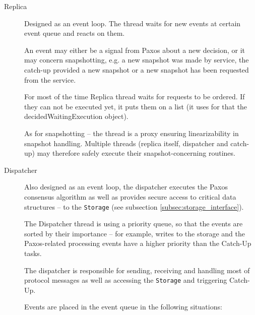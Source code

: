 \begin{description}
  \item[Replica] \hfill
    
    Designed as an event loop. The thread %
    waits for new events at certain event queue and reacts on them.

    An event may either be a signal from Paxos about a new decision, or it may concern snapshotting, e.g. a new snapshot was made by service, the catch-up provided a new snapshot or a new snapshot has been requested from the service.

    For most of the time Replica thread waits for requests to be ordered. If they can not be executed yet, it puts them on a list (it uses for that %
    the decidedWaitingExecution object).
    
    As for snapshotting -- the thread is a proxy ensuring linearizability in snapshot handling.
    Multiple threads (replica itself, dispatcher and catch-up) may therefore safely execute their snapshot-concerning routines.
    
  \item[Dispatcher] \hfill \nopagebreak
    
    Also designed as an event loop, the dispatcher executes the Paxos consensus algorithm as well as provides secure access to critical data structures -- to the \texttt{Storage} (see subsection \ref{subsec:storage_interface}).
    
    The Dispatcher thread is using a priority queue, so that the events are sorted by their importance -- for example, writes to the storage and the Paxos-related processing events have a higher priority than the Catch-Up tasks.
    
    The dispatcher is responsible for sending, receiving and handling most of protocol messages as well as accessing the \texttt{Storage} and triggering Catch-Up.
    
    Events are placed in the event queue in the following situations:
    


\end{description}
